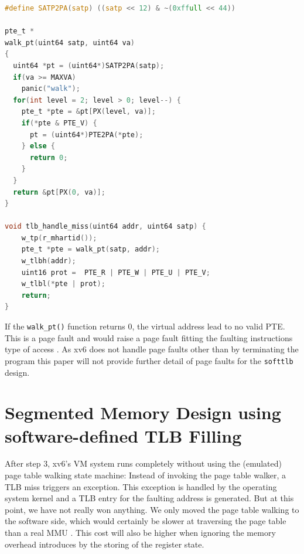 \begin{lstlisting}[language=c,float=t,
    caption={\textbf{TLB miss exception Handler with Page Table Walk}
    The \texttt{walk\_pt()} function walks the Sv39 page table with the base address
    encoded in the \texttt{satp} register. If a PTE with the valid bit set is found, the function
    returns the address encoded in the PTE.
    Otherwise, the function returns \texttt{0}.},
    label={lst:softptw}]
#define SATP2PA(satp) ((satp << 12) & ~(0xffull << 44))

pte_t *
walk_pt(uint64 satp, uint64 va)
{
  uint64 *pt = (uint64*)SATP2PA(satp);
  if(va >= MAXVA)
    panic("walk");
  for(int level = 2; level > 0; level--) {
    pte_t *pte = &pt[PX(level, va)];
    if(*pte & PTE_V) {
      pt = (uint64*)PTE2PA(*pte);
    } else {
      return 0;
    }
  }
  return &pt[PX(0, va)];
}

void tlb_handle_miss(uint64 addr, uint64 satp) {
    w_tp(r_mhartid());
    pte_t *pte = walk_pt(satp, addr);
    w_tlbh(addr);
    uint16 prot =  PTE_R | PTE_W | PTE_U | PTE_V;
    w_tlbl(*pte | prot);
    return;
}
\end{lstlisting}


If the \texttt{walk\_pt()} function returns 0, the virtual address lead to no valid PTE. This is a
page fault and would raise a page fault fitting the faulting instructions type of access \cite{tanenbaumOS}.
As xv6 does not handle page faults other than by terminating the program \cite{cox2011xv6} this
paper will not provide further detail of page faults for the \texttt{softtlb}
design.



\section{Segmented Memory Design using software-defined TLB Filling}

After step 3, xv6's VM system runs completely without using the (emulated) page table
walking state machine:
Instead of invoking the page table walker, a TLB miss triggers an exception. This exception is handled by the
operating system kernel and a TLB entry for the faulting address is generated.
But at this point, we have not really won anything. We only moved the page table walking to the software side,
which would certainly be slower at traversing the page table than a real MMU \cite{jacob1998look}. This cost will also be higher when ignoring the memory overhead introduces by the storing of the register state.

